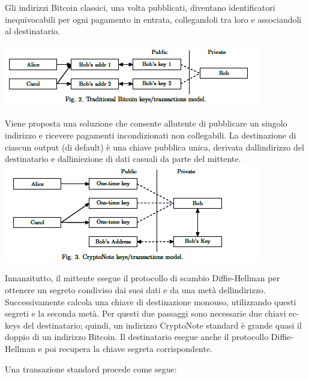 Gli indirizzi Bitcoin classici, una volta pubblicati, diventano
identificatori inequivocabili per ogni pagamento in entrata,
collegandoli tra loro e associandoli al destinatario.

\includegraphics{image6.png}

Viene proposta una soluzione che consente all\textquotesingle utente di
pubblicare un singolo indirizzo e ricevere pagamenti incondizionati non
collegabili. La destinazione di ciascun output (di default) è una chiave
pubblica unica, derivata dall\textquotesingle indirizzo del destinatario
e dall\textquotesingle iniezione di dati casuali da parte del
mittente.\\

\includegraphics{image7.png}

Innanzitutto, il mittente esegue il protocollo di scambio Diffie-Hellman
per ottenere un segreto condiviso dai suoi dati e da una metà
dell\textquotesingle indirizzo. Successivamente calcola una chiave di
destinazione monouso, utilizzando questi segreti e la seconda metà. Per
questi due passaggi sono necessarie due chiavi ec-keys del destinatario;
quindi, un indirizzo CryptoNote standard è grande quasi il doppio di un
indirizzo Bitcoin. Il destinatario esegue anche il protocollo
Diffie-Hellman e poi recupera la chiave segreta corrispondente.

Una transazione standard procede come segue:

